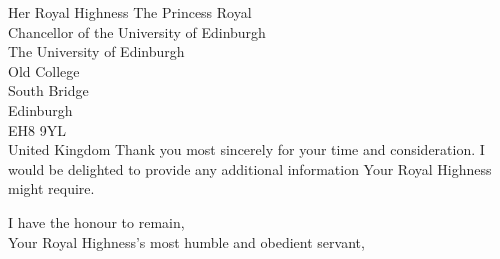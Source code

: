 \documentclass[12pt,a4paper]{letter}
\begin{document}
\begin{letter}{Her Royal Highness The Princess Royal\\Chancellor of the University of Edinburgh\\The University of Edinburgh\\Old College\\South Bridge\\Edinburgh\\EH8 9YL\\United Kingdom}
Thank you most sincerely for your time and consideration. I would be delighted to provide any additional information Your Royal Highness might require.

\closing{I have the honour to remain,\\Your Royal Highness's most humble and obedient servant,}

\signature{Deborah Akuoko}


\end{letter}
\end{document}

